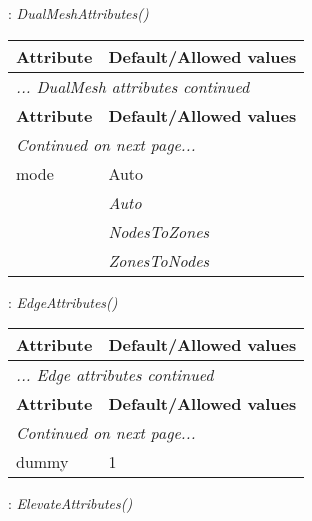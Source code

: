 \documentclass[10pt,a4paper]{report}
\begin{document}
\newpage

{}
: {\it DualMeshAttributes() }\\[-3mm]

\begin{longtable}{ll}
{\bf Attribute} & {\bf Default/Allowed values} \\
\hline \hline
\endfirsthead
\multicolumn{2}{l}{{\it ... DualMesh attributes continued}} \\
{\bf Attribute} & {\bf Default/Allowed values} \\
\hline \hline
\endhead
\hline
\multicolumn{2}{l}{{\it Continued on next page...}} \\
\endfoot
\hline
\endlastfoot

mode  &  Auto   \\
 & {\it  Auto} \\
 & {\it  NodesToZones} \\
 & {\it  ZonesToNodes} \\
\end{longtable}

\newpage

{}
: {\it EdgeAttributes() }\\[-3mm]

\begin{longtable}{ll}
{\bf Attribute} & {\bf Default/Allowed values} \\
\hline \hline
\endfirsthead
\multicolumn{2}{l}{{\it ... Edge attributes continued}} \\
{\bf Attribute} & {\bf Default/Allowed values} \\
\hline \hline
\endhead
\hline
\multicolumn{2}{l}{{\it Continued on next page...}} \\
\endfoot
\hline
\endlastfoot

dummy  &  1 \\
\end{longtable}

\newpage

{}
: {\it ElevateAttributes() }\\[-3mm]
\end{document}
